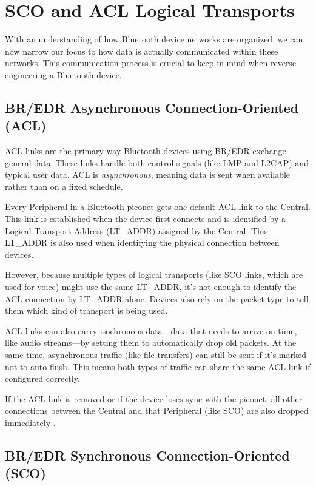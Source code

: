 \section{SCO and ACL Logical Transports}
With an understanding of how Bluetooth device networks are organized, we can now narrow our focus to how data is actually communicated within these networks. This communication process is crucial to keep in mind when reverse engineering a Bluetooth device.

\subsection{BR/EDR Asynchronous Connection-Oriented (ACL)}

ACL links are the primary way Bluetooth devices using BR/EDR exchange general data. These links handle both control signals (like LMP and L2CAP) and typical user data. ACL is \textit{asynchronous}, meaning data is sent when available rather than on a fixed schedule.

Every Peripheral in a Bluetooth piconet gets one default ACL link to the Central. This link is established when the device first connects and is identified by a Logical Transport Address (LT\_ADDR) assigned by the Central. This LT\_ADDR is also used when identifying the physical connection between devices.

However, because multiple types of logical transports (like SCO links, which are used for voice) might use the same LT\_ADDR, it’s not enough to identify the ACL connection by LT\_ADDR alone. Devices also rely on the packet type to tell them which kind of transport is being used.

ACL links can also carry isochronous data—data that needs to arrive on time, like audio streams—by setting them to automatically drop old packets. At the same time, asynchronous traffic (like file transfers) can still be sent if it’s marked not to auto-flush. This means both types of traffic can share the same ACL link if configured correctly.

If the ACL link is removed or if the device loses sync with the piconet, all other connections between the Central and that Peripheral (like SCO) are also dropped immediately \cite{bluetoothcorespec6}.

\subsection{BR/EDR Synchronous Connection-Oriented (SCO)}

